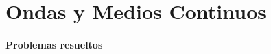 \documentclass[/home/hernan/Documentos/Apuntes_mecanica_teorica/main.tex]{subfiles}
\begin{document}
    \part{Ondas y Medios Continuos}

    \subsection{Problemas resueltos}
    
\end{document}
